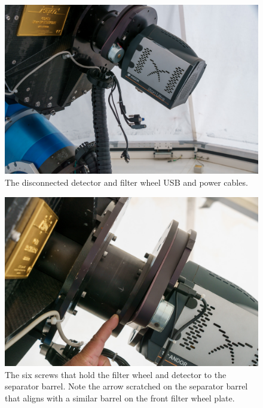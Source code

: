 \begin{figure}
\begin{center}
\includegraphics[width=0.8\linewidth]{figures/huitzi-cables-disconnected.jpg}
\end{center}
\caption{The disconnected detector and filter wheel USB and power cables.}
\label{figure:huitzi-cables-disconnected}
\end{figure}

\begin{figure}
\begin{center}
\includegraphics[width=0.8\linewidth]{figures/huitzi-mounting-screws.jpg}
\end{center}
\caption{The six screws that hold the filter wheel and detector to the separator barrel. Note the arrow scratched on the separator barrel that aligns with a similar barrel on the front filter wheel plate.}
\label{figure:huitzi-mounting-screws}
\end{figure}


